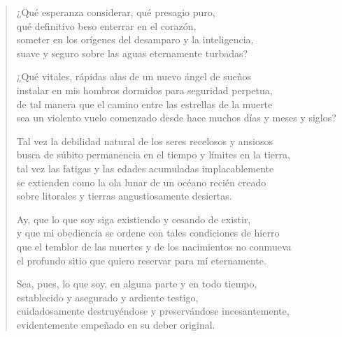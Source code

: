 \documentclass[12pt]{article}
\begin{document}
\clearpage
{}
\begin{verse}

¿Qué esperanza considerar, qué presagio puro,\\
qué definitivo beso enterrar en el corazón,\\
someter en los orígenes del desamparo y la inteligencia,\\
suave y seguro sobre las aguas eternamente turbadas?  

¿Qué vitales, rápidas alas de un nuevo ángel de sueños\\
instalar en mis hombros dormidos para seguridad perpetua,\\
de tal manera que el camino entre las estrellas de la muerte\\
sea un violento vuelo comenzado desde hace muchos días y meses y siglos?  

Tal vez la debilidad natural de los seres recelosos y ansiosos\\
busca de súbito permanencia en el tiempo y límites en la tierra,\\
tal vez las fatigas y las edades acumuladas implacablemente\\
se extienden como la ola lunar de un océano recién creado\\
sobre litorales y tierras angustiosamente desiertas.  

Ay, que lo que soy siga existiendo y cesando de existir,\\
y que mi obediencia se ordene con tales condiciones de hierro\\
que el temblor de las muertes y de los nacimientos no conmueva\\
el profundo sitio que quiero reservar para mí eternamente.  

Sea, pues, lo que soy, en alguna parte y en todo tiempo,\\
establecido y asegurado y ardiente testigo,\\
cuidadosamente destruyéndose y preservándose incesantemente,\\
evidentemente empeñado en su deber original.

\end{verse}
\end{document}
